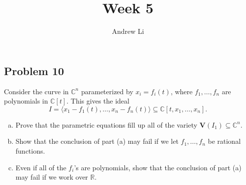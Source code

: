 \documentclass{homework}
\title{Week 5}
\author{Andrew Li}
\newcommand{\id}[1]{\langle #1 \rangle}
\newcommand{\V}{\mathbf{V}}
\begin{document}
    \maketitle
    
    \setcounter{section}{3}
    \setcounter{subsection}{2}
    \subsection{Problem 10}
    Consider the curve in $\mathbb C^n$ parameterized by $x_i = f_i(t)$, where $f_1, \dots, f_n$ are polynomials in $\mathbb C[t]$. This gives the ideal
    \[I = \id{x_1 - f_1(t), \dots, x_n - f_n(t)} \subseteq \mathbb C[t, x_1, \dots, x_n].\]
    \begin{enumerate}[(a)]
        \item Prove that the parametric equations fill up all of the variety $\V(I_1) \subseteq \mathbb C^n$.
        \item Show that the conclusion of part (a) may fail if we let $f_1, \dots, f_n$ be rational functions.
        \item Even if all of the $f_i$'s are polynomials, show that the conclusion of part (a) may fail if we work over $\mathbb R$.
    \end{enumerate}
    
\end{document}
